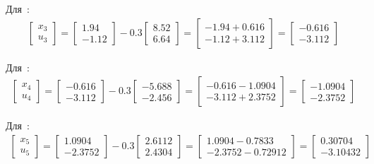 \begin{enumerate}
	Для \,:
	\begin{align*}
		\begin{bmatrix}
			x_{3} \\ u_{3}
		\end{bmatrix}
		=
		\begin{bmatrix}
			1.94\\
			-1.12
		\end{bmatrix}
		-
		0.3
		\begin{bmatrix}
		   8.52 \\
		   6.64
		\end{bmatrix}
		=
		\begin{bmatrix}
			-1.94 + 0.616 \\ -1.12 + 3.112
		\end{bmatrix}
		= 
		\begin{bmatrix}
			-0.616 \\ -3.112
		\end{bmatrix}	
	\end{align*}
	
	Для \,:
	\begin{align*}
		\begin{bmatrix}
		x_{4} \\ u_{4}
		\end{bmatrix}
		=
		\begin{bmatrix}
  			-0.616\\
			-3.112
		\end{bmatrix}
		-
		0.3
		\begin{bmatrix}
		  -5.688 \\
		  -2.456
		\end{bmatrix}
		=
		\begin{bmatrix}
			-0.616 - 1.0904 \\ -3.112 +2.3752
		\end{bmatrix}
		= 
		\begin{bmatrix}
			-1.0904 \\ -2.3752
		\end{bmatrix}	
	\end{align*}
	
	Для \,:
	\begin{align*}
		\begin{bmatrix}
		x_{5} \\ u_{5}
		\end{bmatrix}
		=
		\begin{bmatrix}
			1.0904 \\
			-2.3752
		\end{bmatrix}
		-
		0.3
		\begin{bmatrix}
			2.6112 \\
			2.4304
		\end{bmatrix}
		=
		\begin{bmatrix}
			1.0904 - 0.7833 \\ -2.3752 - 0.72912 
		\end{bmatrix}
		= 
		\begin{bmatrix}
			0.30704 \\ -3.10432
		\end{bmatrix}	
	\end{align*}
	

\end{enumerate}
